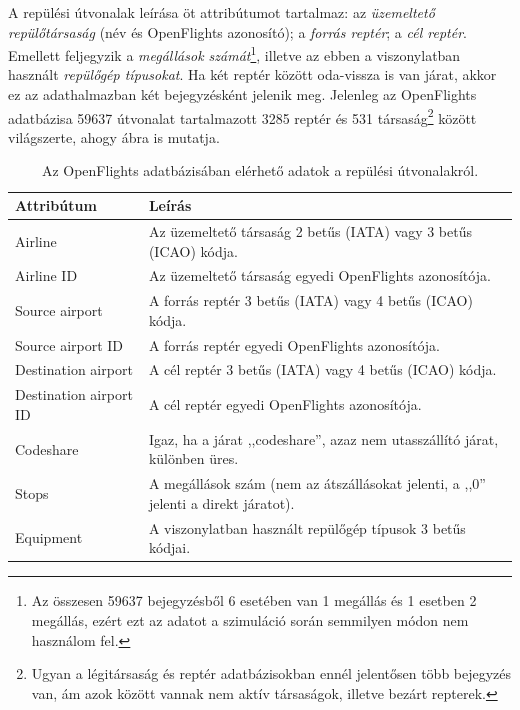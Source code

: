     A repülési útvonalak leírása öt attribútumot tartalmaz: az \textit{üzemeltető repülőtársaság} (név és OpenFlights azonosító); a \textit{forrás reptér}; a \textit{cél reptér}. Emellett feljegyzik a \textit{megállások számát}\footnote{Az összesen 59637 bejegyzésből 6 esetében van 1 megállás és 1 esetben 2 megállás, ezért ezt az adatot a szimuláció során semmilyen módon nem használom fel.}, illetve az ebben a viszonylatban használt \textit{repülőgép típusokat}. Ha két reptér között oda-vissza is van járat, akkor ez az adathalmazban két bejegyzésként jelenik meg. Jelenleg az OpenFlights adatbázisa 59637 útvonalat tartalmazott 3285 reptér és 531 társaság\footnote{Ugyan a légitársaság és reptér adatbázisokban ennél jelentősen több bejegyzés van, ám azok között vannak nem aktív társaságok, illetve bezárt repterek.} között világszerte, ahogy  ábra is mutatja.

    \begin{table}[ht]
      \footnotesize
      \centering
      \caption{Az OpenFlights adatbázisában elérhető adatok a repülési útvonalakról.}
      \begin{tabular}{ | l | l |}
      \hline
      Attribútum & Leírás \\ \hline
      Airline & Az üzemeltető társaság 2 betűs (IATA) vagy 3 betűs (ICAO) kódja.\\
      Airline ID & Az üzemeltető társaság egyedi OpenFlights azonosítója.\\
      Source airport & A forrás reptér 3 betűs (IATA) vagy 4 betűs (ICAO) kódja.\\
      Source airport ID & A forrás reptér egyedi OpenFlights azonosítója.\\
      Destination airport & A cél reptér 3 betűs (IATA) vagy 4 betűs (ICAO) kódja.\\
      Destination airport ID & A cél reptér egyedi OpenFlights azonosítója.\\
      Codeshare & Igaz, ha a járat ,,codeshare'', azaz nem utasszállító járat, különben üres.\\
      Stops & A megállások szám (nem az átszállásokat jelenti, a ,,0'' jelenti a direkt járatot).\\
      Equipment & A viszonylatban használt repülőgép típusok 3 betűs kódjai.\\
      \hline
      \end{tabular}
      \label{tab:table_repulesiutvonalak}
    \end{table}

